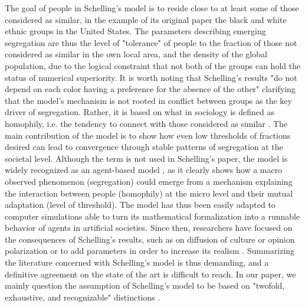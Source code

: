 \documentclass{ws-acs}
\begin{document}
The goal of people in Schelling's model \cite{schelling69} is to reside close to at least some of those considered as similar, in the example of its original paper the black and white ethnic groups in the United States. The parameters describing emerging segregation are thus the level of "tolerance" of people to the fraction of those not considered as similar in the own local area, and the density of the global population, due to the logical constraint that not both of the groups can hold the status of numerical superiority. It is worth noting that Schelling's results "do not depend on each color having a preference for the absence of the other" \cite[p.~493]{schelling69} clarifying that the model's mechanism is not rooted in conflict between groups as the key driver of segregation. Rather, it is based on what in sociology is defined as homophily, i.e. the tendency to connect with those considered as similar \cite{mcpherson01}. The main contribution of the model is to show how even low thresholds of fractions desired can lead to convergence through stable patterns of segregation at the societal level. Although the term is not used in Schelling's paper, the model is widely recognized as an agent-based model \cite{hatna2015}, as it clearly shows how a macro observed phenomenon (segregation) could emerge from a mechanism explaining the interaction between people (homophily) at the micro level and their mutual adaptation (level of threshold). The model has thus been easily adapted to computer simulations able to turn its mathematical formalization into a runnable behavior of agents in artificial societies. Since then, researchers have focused on the consequences of Schelling's results, such as on diffusion of culture \cite{gracia2009}
 or opinion polarization \cite{feliciani2017} or to add parameters in order to increase its realism \cite{clark2008}. Summarizing the literature concerned with Schelling's model is thus demanding, and a definitive agreement on the state of the art is difficult to reach. In our paper, we mainly question the assumption of Schelling's model to be based on "twofold, exhaustive, and recognizable" distinctions \cite[p.~488]{schelling69}.
\end{document}
